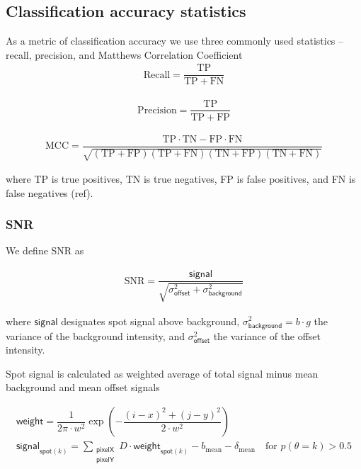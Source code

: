 \subsection*{Classification accuracy statistics}

As a metric of classification accuracy we use three commonly used statistics -- recall, precision, and Matthews Correlation Coefficient \cite{Matthews1975-rw}
\begin{gather*}
    \mathrm{Recall} = \dfrac{\mathrm{TP}}{\mathrm{TP} + \mathrm{FN}}
\end{gather*}

\begin{gather*}
    \mathrm{Precision} = \dfrac{\mathrm{TP}}{\mathrm{TP} + \mathrm{FP}}
\end{gather*}

\begin{gather*}
    \mathrm{MCC} =
        \dfrac{\mathrm{TP} \cdot \mathrm{TN} - \mathrm{FP} \cdot \mathrm{FN}}
        {\sqrt{(\mathrm{TP} + \mathrm{FP}) (\mathrm{TP} + \mathrm{FN}) (\mathrm{TN} + \mathrm{FP}) (\mathrm{TN} + \mathrm{FN})}}
\end{gather*}

\noindent
where TP is true positives, TN is true negatives, FP is false positives, and FN is false negatives (ref).

\subsubsection*{SNR}

We define SNR as

\begin{gather*}
    \mathrm{SNR} = \dfrac{\mathsf{signal}}{\sqrt{\sigma^2_{\mathsf{offset}} + \sigma^2_{\mathsf{background}}}}
\end{gather*}

where $\mathsf{signal}$ designates spot signal above background, $\sigma^2_{\mathsf{background}} = b \cdot g$ the variance of the background intensity, and $\sigma^2_{\mathsf{offset}}$ the variance of the offset intensity.

Spot signal is calculated as weighted average of total signal minus mean background and mean offset signals

\begin{gather*}
    \mathsf{weight} = \dfrac{1}{2 \pi \cdot w^2} \exp{\left( -\dfrac{(i-x)^2 + (j-y)^2}{2 \cdot w^2} \right)} \\
    \mathsf{signal}_{\mathsf{spot}(k)} =  \sum_{\substack{\mathsf{pixelX} \\ \mathsf{pixelY}}} D \cdot \mathsf{weight}_{\mathsf{spot}(k)} - b_{\mathrm{mean}} - \delta_\mathrm{mean} \quad \textrm{for } p(\theta = k) > 0.5
\end{gather*}


